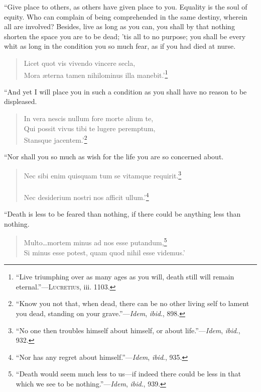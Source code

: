 ``Give place to others, as others have given place to you. Equality is
the soul of equity. Who can complain of being comprehended in the same
destiny, wherein all are involved?  Besides, live as long
as you can, you shall by that nothing shorten the space you are to be
dead; 'tis all to no purpose; you shall be every whit as long in the
condition you so much fear, as if you had died at nurse.

\begin{verse}
\vin {}Licet quot vis vivendo vincere secla,\\
Mora \ae terna tamen nihilominus illa manebit.'\footnote{``Live
triumphing over as many ages as you will, death still will remain
eternal.''---\textsc{Lucretius}, iii. 1103.}
\end{verse}

\noindent ``And yet I will place you in such a condition as you shall
have no reason to be displeased.

\begin{verse}
In vera nescis nullum fore morte alium te,\\ Qui possit
vivus tibi te lugere peremptum,\\ Stansque jacentem.'\footnote{``Know
you not that, when dead, there can be no other living self to lament
you dead, standing on your grave.''---\textit{Idem}, \textit{ibid}.,
898.}
\end{verse}

\noindent ``Nor shall you so much as wish for the life you are so
concerned about.

\begin{verse}
Nec sibi enim quisquam tum se vitamque
requirit.\footnote{``No one then troubles himself about himself, or
about life.''---\textit{Idem}, \textit{ibid}., 932.}\\
\dotfill\\
Nec desiderium nostri nos afficit ullum.'\footnote{``Nor has any
regret about himself.''---\textit{Idem}, \textit{ibid}., 935.}
\end{verse}

``Death is less to be feared than nothing, if there could be anything
less than nothing.

\begin{verse}
Multo\ldots mortem minus ad nos esse
putandum,\footnote{``Death would seem much less to us---if indeed
there could be less in that which we see to be
nothing.''---\textit{Idem}, \textit{ibid}., 939.}\\ Si minus esse
potest, quam quod nihil esse videmus.'
\end{verse}

